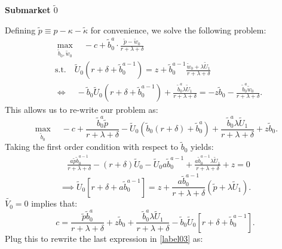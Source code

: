 \documentclass[12pt]{article} %
\theoremstyle{definition}
\begin{document}
\begin{appendix}
\medskip

\noindent \textbf{Submarket $\tilde{0}$}

\medskip

\noindent Defining $\tilde{p}\equiv p-\kappa-\tilde{\kappa}$ for convenience, we solve the following problem:  
\begin{align*}
& \max_{\tilde{b}_0,\tilde{w}_0} \quad -c + \tilde{b}_0^a \cdot \frac{\tilde{p}-\tilde{w}_0}{r+\lambda+\delta} \\
& \text{s.t.} \quad \tilde{U}_0(r+\delta+\tilde{b}_0^{a-1}) = z + \tilde{b}_0^{a-1} \frac{\tilde{w}_0+\lambda \tilde{U}_1}{r+\lambda+\delta} \\
& \iff \quad -\tilde{b}_0 \tilde{U}_0(r+\delta+\tilde{b}_0^{a-1}) + \frac{\tilde{b}_0^{a} \lambda \tilde{U}_1}{r+\lambda+\delta}  = -z\tilde{b}_0 -  \frac{\tilde{b}_0^{a}\tilde{w}_0}{r+\lambda+\delta}. 
\end{align*}
This allows us to re-write our problem as: 
\begin{equation*}
\max_{\tilde{b}_0} \quad -c + \frac{\tilde{b}_0^a \tilde{p}}{r+\lambda+\delta} - \tilde{U}_0(\tilde{b}_0(r+
\delta)+\tilde{b}_0^a) + \frac{\tilde{b}_0^{a} \lambda \tilde{U}_1}{r+\lambda+\delta} +  z\tilde{b}_0.
\end{equation*}
Taking the first order condition with respect to $\tilde{b}_0$ yields: 
\begin{align*}
& \frac{a \tilde{p} \tilde{b}_0^{a-1}}{r+\lambda+\delta} - (r+\delta) \tilde{U}_0 - \tilde{U}_0 a \tilde{b}_0^{a-1} + \frac{a\tilde{b}_0^{a-1} \lambda \tilde{U}_1}{r+\lambda+\delta}+z= 0 
\end{align*}
\begin{equation}
 \implies \tilde{U}_0[r+\delta+a\tilde{b}_0^{a-1}] = z + \frac{a \tilde{b}_0^{a-1}}{r+\lambda+\delta}(\tilde{p}+\lambda \tilde{U}_1). \label{label03}%
\end{equation}
$\tilde{V_0}=0$ implies that:
\begin{equation*}
 c = \frac{\tilde{p} \tilde{b}_0^{a}}{r+\lambda+\delta} + z \tilde{b}_0 + \frac{\tilde{b}_0^{a}\lambda \tilde{U}_1}{r+\lambda+\delta} -\tilde{b}_0\tilde{U}_0[r+\delta+\tilde{b}_0^{a-1}].
\end{equation*}
Plug this to rewrite the last expression in \ref{label03} as: 


\end{appendix}
\end{document}
